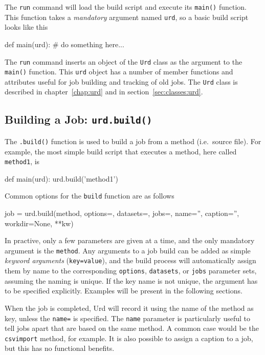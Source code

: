 The \texttt{run} command will load the build script and execute
its \texttt{main()} function.  This function takes
a \textsl{mandatory} argument named \texttt{urd}, so a basic build
script looks like this
\begin{python}
def main(urd):
    # do something here...
\end{python}
The \texttt{run} command inserts an object of the \texttt{Urd} class
as the argument to the \texttt{main()} function.  This \texttt{urd}
object has a number of member functions and attributes useful for job
building and tracking of old jobs.  The \texttt{Urd} class is
described in chapter~\ref{chap:urd} and in
section~\ref{sec:classes:urd}.



\subsection{Building a Job: \texttt{urd.build()}}
The \texttt{.build()} function is used to build a job from a method
(i.e.\ source file).  For example, the most simple build script that
executes a method, here called \texttt{method1}, is
\begin{python}
def main(urd):
    urd.build('method1')
\end{python}
Common options for the \texttt{build} function are as follows
\begin{python}
    job = urd.build(method,
                    options={}, datasets={}, jobs={},
                    name='', caption='', workdir=None, **kw)
\end{python}
In practive, only a few parameters are given at a time, and the only
mandatory argument is the \texttt{method}.  Any arguments to a job
build can be added as simple \textsl{keyword arguments}
(\texttt{key=value}), and the build process will
automatically assign them by name to the corresponding
\texttt{options}, \texttt{datasets}, or \texttt{jobs} parameter
sets, assuming the naming is unique.  If the key name is not unique,
the argument has to be specified explicitly.  Examples will be present
in the following sections.

When the job is completed, Urd will record it using the name of the
method as key, unless the \texttt{name=} is specified.
The \texttt{name} parameter is particularly useful to tell jobs apart
that are based on the same method.  A common case would be
the \texttt{csvimport} method, for example.  It is also possible to
assign a caption to a job, but this has no functional benefits.

